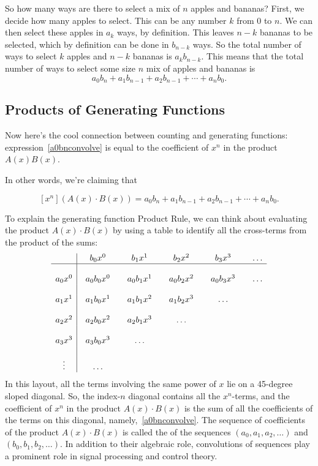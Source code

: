 So how many ways are there to select a mix of $n$ apples and bananas?
First, we decide how many apples to select.  This can be any number
$k$ from 0 to $n$.  We can then select these apples in $a_k$ ways, by
definition.  This leaves $n-k$ bananas to be selected, which by
definition can be done in $b_{n-k}$ ways.  So the total number of ways
to select $k$ apples and $n-k$ bananas is $a_kb_{n-k}$.  This means
that the total number of ways to select some size $n$ mix of apples
and bananas is
\begin{equation}\label{a0bnconvolve}
a_0b_n + a_1b_{n-1} + a_2b_{n-1} + \cdots + a_nb_0.
\end{equation}

\subsection{Products of Generating Functions}
Now here's the cool connection between counting and generating
functions: expression~\eqref{a0bnconvolve} is equal to the coefficient
of $x^n$ in the product $A(x)B(x)$.

In other words, we're claiming that
\begin{rul*}[Product]
\begin{equation}\label{xnAxBx}
[x^n](A(x)\cdot B(x)) = a_0b_n + a_1b_{n-1} + a_2b_{n-1} + \cdots +
a_nb_0.
\end{equation}
\end{rul*}
To explain the generating function Product Rule, we can think about
evaluating the product $A(x) \cdot B(x)$ by using a table to identify
all the cross-terms from the product of the sums:
\[
\begin{array}{c|@{\quad}c@{\qquad}c@{\qquad}c@{\qquad}c@{\qquad}c}
      & b_0 x^0 & b_1 x^1 & b_2 x^2 & b_3 x^3 & \dots \\
\hline
\\
a_0 x^0 & a_0 b_0 x^0 & a_0 b_1 x^1 & a_0 b_2 x^2 & a_0 b_3 x^3 & \dots \\
\\
a_1 x^1 & a_1 b_0 x^1 & a_1 b_1 x^2 & a_1 b_2 x^3 & \dots \\
\\
a_2 x^2 & a_2 b_0 x^2 & a_2 b_1 x^3 & \dots \\
\\
a_3 x^3 & a_3 b_0 x^3 & \dots \\
\\
\vdots & \dots\\
\end{array}
\]
In this layout, all the terms involving the same power of $x$ lie on a
45-degree sloped diagonal.  So, the index-$n$ diagonal contains all the
$x^n$-terms, and the coefficient of $x^n$ in the product $A(x)\cdot
B(x)$ is the sum of all the coefficients of the terms on this
diagonal, namely,~\eqref{a0bnconvolve}.  The sequence of coefficients
of the product $A(x)\cdot B(x)$ is called the  of
the sequences $(a_0, a_1, a_2, \dots)$ and $(b_0, b_1, b_2, \dots)$.
In addition to their algebraic role, convolutions of sequences play a
prominent role in signal processing and control theory.

